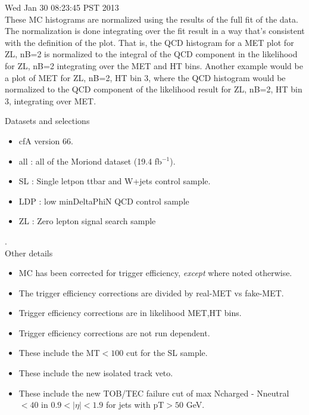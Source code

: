\documentclass[11pt]{article}
\begin{document}
  Wed Jan 30 08:23:45 PST 2013 \\


  These MC histograms are normalized using the results of the full fit of the data.
  The normalization is done integrating over the fit result in a way that's consistent
  with the definition of the plot.
  That is, the QCD histogram for a MET plot for ZL, nB=2 is normalized to the
  integral of the QCD component in the likelihood for ZL, nB=2 integrating
  over the MET and HT bins.
  Another example would be a plot of MET for ZL, nB=2, HT bin 3, where the
  QCD histogram would be normalized to the QCD component of the likelihood
  result for ZL, nB=2, HT bin 3, integrating over MET.

  \vspace{1cm}

   Datasets and selections
   \begin{itemize}
     \item cfA version 66.
     \item all : all of the Moriond dataset (19.4 fb$^{-1}$).
     \item SL : Single letpon ttbar and W+jets control sample.
     \item LDP : low minDeltaPhiN QCD control sample
     \item ZL : Zero lepton signal search sample
   \end{itemize}

.\\

   Other details
   \begin{itemize}
     \item MC has been corrected for trigger efficiency, {\it except} where noted otherwise.
     \item  The trigger efficiency corrections are divided by real-MET vs fake-MET.
     \item Trigger efficiency corrections are in likelihood MET,HT bins.
     \item Trigger efficiency corrections are not run dependent.
     \item These include the MT$<100$ cut for the SL sample.
     \item These include the new isolated track veto.
     \item These include the new TOB/TEC failure cut of max Ncharged - Nneutral $<40$ in $0.9<|\eta|<1.9$ for
             jets with pT$>50$ GeV.
   \end{itemize}


  \pagebreak
  \clearpage
  \tableofcontents
  \clearpage
\end{document}
